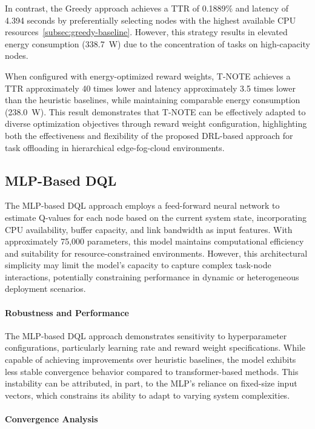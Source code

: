 \documentclass[preprint,3p,authoryear]{elsarticle}
\begin{document}
In contrast, the Greedy approach achieves a TTR of 0.1889\% and latency of 4.394 seconds by preferentially selecting nodes with the highest available CPU resources~\ref{subsec:greedy-baseline}. However, this strategy results in elevated energy consumption (338.7~W) due to the concentration of tasks on high-capacity nodes.

When configured with energy-optimized reward weights, T-NOTE achieves a TTR approximately 40 times lower and latency approximately 3.5 times lower than the heuristic baselines, while maintaining comparable energy consumption (238.0~W). This result demonstrates that T-NOTE can be effectively adapted to diverse optimization objectives through reward weight configuration, highlighting both the effectiveness and flexibility of the proposed DRL-based approach for task offloading in hierarchical edge-fog-cloud environments.



\subsection{MLP-Based DQL}\label{subsec:mlp_perf}

The MLP-based DQL approach employs a feed-forward neural network to estimate Q-values for each node based on the current system state, incorporating CPU availability, buffer capacity, and link bandwidth as input features. With approximately 75,000 parameters, this model maintains computational efficiency and suitability for resource-constrained environments. However, this architectural simplicity may limit the model's capacity to capture complex task-node interactions, potentially constraining performance in dynamic or heterogeneous deployment scenarios.

\paragraph{Robustness and Performance}

The MLP-based DQL approach demonstrates sensitivity to hyperparameter configurations, particularly learning rate and reward weight specifications. While capable of achieving improvements over heuristic baselines, the model exhibits less stable convergence behavior compared to transformer-based methods. This instability can be attributed, in part, to the MLP's reliance on fixed-size input vectors, which constrains its ability to adapt to varying system complexities.

\paragraph{Convergence Analysis}
\end{document}
